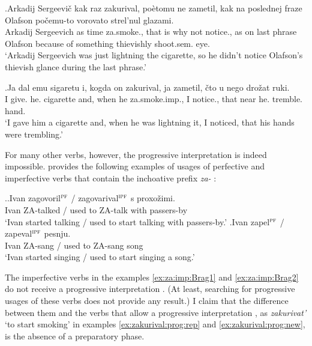 \exg.\label{ex:zakurival:prog:rep}Arkadij Sergeevi\v{c} kak raz zakurival, po\`{e}tomu ne zametil, kak na poslednej fraze Olafson po\v{c}emu-to vorovato strel'nul glazami.\\
Arkadij Sergeevich as time za.smoke., {that is why} not notice., as on last phrase Olafson {because of something} thievishly shoot.sem. eye.\\
\trans `Arkadij Sergeevich was just lightning the cigarette, so he didn't notice Olafson's thievish glance during the last phrase.'

\exg.\label{ex:zakurival:prog:new}Ja dal emu sigaretu i, kogda on zakurival, ja zametil, \v{c}to u nego dro\v{z}at ruki.\\
I give. he. cigarette and, when he za.smoke.imp., I notice., that near he. tremble. hand.\\
\trans `I gave him a cigarette and, when he was lightning it, I noticed, that his hands were trembling.'\\

For many other verbs, however, the progressive interpretation  is indeed impossible. \citet{Braginsky:08} provides the following examples of usages of perfective and imperfective verbs  that contain the inchoative  prefix \textit{za-}  :

\ex.\label{ex:za:imp:Brag}\ag.\label{ex:za:imp:Brag1}Ivan zagovoril$^{\textsc{pf}}$ / zagovarival$^{\textsc{ipf}}$ s proxo\v{z}imi.\\
Ivan ZA-talked / {used to ZA-talk} with passers-by\\
\trans `Ivan started talking / used to start talking with passers-by.'
\bg.\label{ex:za:imp:Brag2}Ivan zapel$^{\textsc{pf}}$ / zapeval$^{\textsc{ipf}}$ pesnju.\\
Ivan ZA-sang / {used to ZA-sang} song\\
\trans `Ivan started singing / used to start singing a song.'\\

The imperfective verbs  in the examples \ref{ex:za:imp:Brag1} and \ref{ex:za:imp:Brag2} do not receive a progressive interpretation . (At least, searching for progressive usages of these verbs does not provide any result.) I claim that the difference between them and the verbs that allow a progressive interpretation , as \textit{zakurivat'} `to start smoking' in examples \ref{ex:zakurival:prog:rep} and \ref{ex:zakurival:prog:new}, is the absence of a preparatory phase. 

